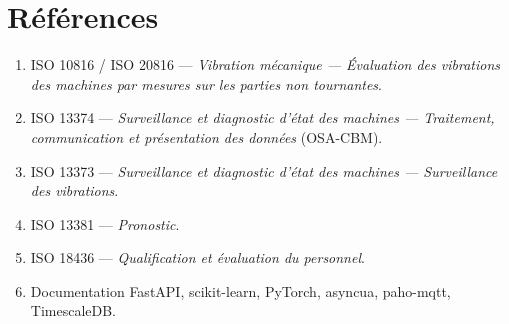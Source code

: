 \documentclass[12pt,a4paper]{article}
\begin{document}
\section*{Références}
\begin{enumerate}[leftmargin=1.6em]
  \item ISO 10816 / ISO 20816 --- \emph{Vibration mécanique --- Évaluation des vibrations
        des machines par mesures sur les parties non tournantes}.
  \item ISO 13374 --- \emph{Surveillance et diagnostic d'état des machines ---
        Traitement, communication et présentation des données} (OSA-CBM).
  \item ISO 13373 --- \emph{Surveillance et diagnostic d'état des machines ---
        Surveillance des vibrations}.
  \item ISO 13381 --- \emph{Pronostic}.
  \item ISO 18436 --- \emph{Qualification et évaluation du personnel}.
  \item Documentation FastAPI, scikit-learn, PyTorch, asyncua, paho-mqtt, TimescaleDB.
\end{enumerate}
\end{document}
